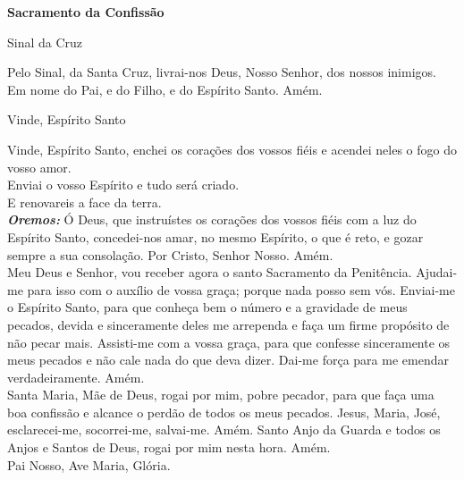 \newpage
\begin{center}
    \textbf{Sacramento da Confissão}
\end{center}
\begin{center}
    Sinal da Cruz
\end{center}
\begin{flushleft}
    Pelo Sinal, \grecrossRed{} da Santa Cruz, livrai-nos Deus, \grecrossRed{} Nosso Senhor, dos nossos \grecrossRed{} inimigos. Em nome do Pai, \grecrossRed{} e do Filho, e do Espírito Santo. Amém.
\end{flushleft}
\begin{center}
    Vinde, Espírito Santo
\end{center}
\begin{flushleft}
    Vinde, Espírito Santo, enchei os corações dos vossos fiéis e acendei neles o fogo do vosso amor. \\
    \VbarRed{} Enviai o vosso Espírito e tudo será criado. \\
    \RbarRed{} E renovareis a face da terra.
    \vspace{.2cm} \\
    \textbf{\textit{Oremos:}} Ó Deus, que instruístes os corações dos vossos fiéis com a luz do Espírito Santo, concedei-nos amar, no mesmo Espírito, o que é reto, e gozar sempre a sua consolação. Por Cristo, Senhor Nosso. Amém.
    \vspace{.2cm} \\
    Meu Deus e Senhor, vou receber agora o santo Sacramento da Penitência. Ajudai-me para isso com o auxílio de vossa graça; porque nada posso sem vós. Enviai-me o Espírito Santo, para que conheça bem o número e a gravidade de meus pecados, devida e sinceramente deles me arrependa e faça um firme propósito de não pecar mais. Assisti-me com a vossa graça, para que confesse sinceramente os meus pecados e não cale nada do que deva dizer. Dai-me força para me emendar verdadeiramente. Amém.
    \vspace{.2cm} \\
    Santa Maria, Mãe de Deus, rogai por mim, pobre pecador, para que faça uma boa confissão e alcance o perdão de todos os meus pecados. Jesus, Maria, José, esclarecei-me, socorrei-me, salvai-me. Amém. Santo Anjo da Guarda e todos os Anjos e Santos de Deus, rogai por mim nesta hora. Amém.
    \vspace{.2cm} \\
    Pai Nosso, Ave Maria, Glória.
\end{flushleft}
